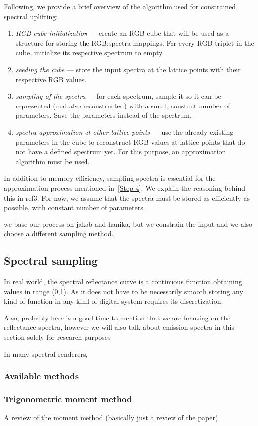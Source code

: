 Following, we provide a brief overview of the algorithm used for constrained spectral uplifting:
\begin{enumerate}[label=S.\arabic*]
	\item \emph{RGB cube initialization} --- create an RGB cube that will be used as a structure for storing the RGB:spectra mappings. For every RGB triplet in the cube, initialize its respective spectrum to empty.
	\item \emph{seeding the cube} --- store the input spectra at the lattice points with their respective RGB values.
	\item \emph{sampling of the spectra} --- for each spectrum, sample it so it can be represented (and also reconstructed) with a small, constant number of parameters. Save the parameters instead of the spectrum.
	\item \label{Step 4} \emph{spectra approximation at other lattice points} --- use the already existing parameters in the cube to reconstruct RGB values at lattice points that do not have a defined spectrum yet. For this purpose, an approximation algorithm must be used.
\end{enumerate}
In addition to memory efficiency, sampling spectra is essential for the approximation process mentioned in~\ref{Step 4}. We explain the reasoning behind this in ref3. For now, we assume that the spectra must be stored as efficiently as possible, with constant number of parameters.

we base our process on jakob and hanika, but we constrain the input and we also choose a different sampling method.

\subsection{Spectral sampling}

In real world, the spectral reflectance curve is a continuous function obtaining values in range (0,1). As it does not have to be necessarily smooth storing any kind of function in any kind of digital system requires its discretization.


Also, probably here is a good time to mention that we are focusing on the reflectance spectra, however we will also talk about emission spectra in this section solely for research purposes

In many spectral renderers,  

\subsubsection{Available methods}

\subsubsection{Trigonometric moment method}

A review of the moment method (basically just a review of the paper)

